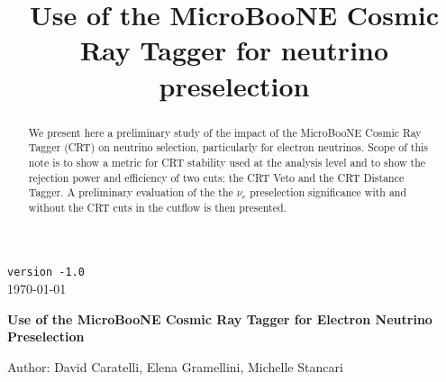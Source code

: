\documentclass[a4paper]{article}
\title{Use of the MicroBooNE Cosmic Ray Tagger for neutrino preselection}
\begin{document}
\def\Journal#1#2#3#4{{#1} {\bf #2}, #3 (#4)}
\def\etal{{\it et\ al.}}
\def\numunue{\nu_\mu\rightarrow\nu_e}
\def\numunutau{\nu_\mu\rightarrow\nu_\tau}
\def\nuebar{\bar\nu_e}
\def\nue{\nu_e}
\def\nutau{\nu_\tau}
\def\numubar{\bar\nu_\mu}
\def\numu{\nu_\mu}
\def\ra{\rightarrow}
\def\numubarnuebar{\bar\nu_\mu\rightarrow\bar\nu_e}
\def\nuebarnumubar{\bar\nu_e\rightarrow\bar\nu_\mu}
\def\osc{\rightsquigarrow}
\def\inteni{{\cal I}_{pot}}
\def\fmerit{{\cal F}}
\begin{flushright}
{\tt version -1.0}\\ 
\today
\end{flushright}
\vspace*{0.6cm}
\begin{center}
{\Large \bf Use of the MicroBooNE Cosmic Ray Tagger for Electron Neutrino Preselection}
\vspace*{1.6cm}
\setcounter{footnote}{0}  
\def\A{\kern+.6ex\lower.42ex\hbox{$\scriptstyle \iota$}\kern-1.20ex a}
\def\E{\kern+.5ex\lower.42ex\hbox{$\scriptstyle \iota$}\kern-1.10ex e}
\small
\newcommand{\Aname}[2]{#1}
\def\titlefoot#1{\vspace{-0.3cm}\begin{center}{\bf #1}\end{center}}

Author: David Caratelli, Elena Gramellini, Michelle Stancari

\end{center}
\vspace*{1cm}


\begin{abstract}

We present here a preliminary study of the impact of the MicroBooNE Cosmic Ray Tagger (CRT) on neutrino selection, particularly for electron neutrinos. Scope of this note is to show a metric for CRT stability used at the analysis level and to show the rejection power and efficiency of two cuts: the CRT Veto and the CRT Distance Tagger. A preliminary evaluation of the the $\nu_e$ preselection significance with and without the CRT cuts in the cutflow is then presented.


\end{abstract} 

\tableofcontents


\newpage

\appendix
%
\newpage
\clearpage


\newpage
%
%

%
\end{document}
